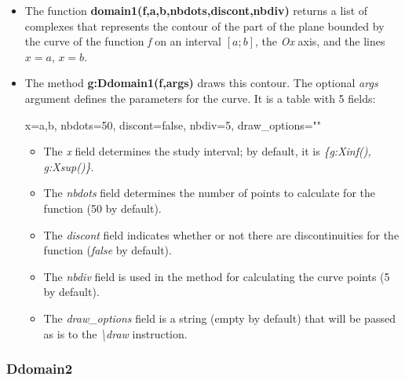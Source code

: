 \begin{itemize}
    \item The function \textbf{domain1(f,a,b,nbdots,discont,nbdiv)} returns a list of complexes that represents the contour of the part of the plane bounded by the curve of the function \emph{f} on an interval \([a;b]\), the \emph{Ox} axis, and the lines \(x=a\), \(x=b\).

    \item The method \textbf{g:Ddomain1(f,args)} draws this contour. The optional \emph{args} argument defines the parameters for the curve. It is a table with 5 fields:

\begin{TeXcode}
{ x={a,b}, nbdots=50, discont=false, nbdiv=5, draw_options="" }
\end{TeXcode}

\begin{itemize}
    \item The \emph{x} field determines the study interval; by default, it is \emph{\{g:Xinf(), g:Xsup()\}}.
    \item The \emph{nbdots} field determines the number of points to calculate for the function (50 by default).
    \item The \emph{discont} field indicates whether or not there are discontinuities for the function (\emph{false} by default).     \item The \emph{nbdiv} field is used in the method for calculating the curve points (5 by default).
    \item The \emph{draw\_options} field is a string (empty by default) that will be passed as is to the \emph{\textbackslash draw} instruction.
\end{itemize}
\end{itemize}

\subsubsection{Ddomain2}

